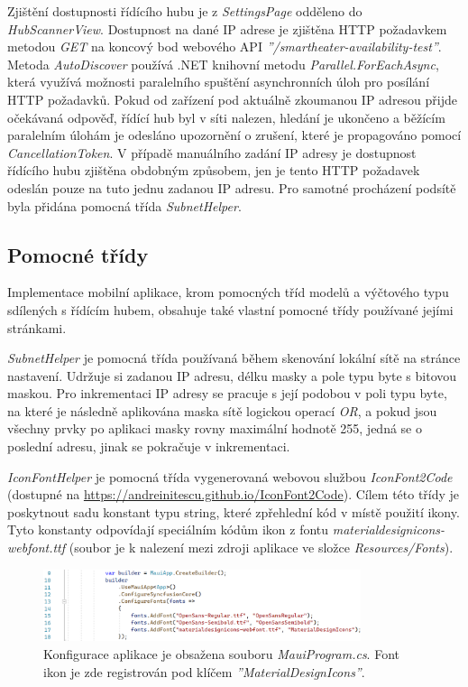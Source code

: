 Zjištění dostupnosti řídícího hubu je z {\it SettingsPage} odděleno do {\it HubScannerView}. Dostupnost na dané IP adrese je zjištěna HTTP požadavkem metodou {\it GET} na koncový bod webového API {\it ''/smartheater-availability-test''}. Metoda {\it AutoDiscover} používá .NET knihovní metodu {\it Parallel.ForEachAsync}, která využívá možnosti paralelního spuštění asynchronních úloh pro posílání HTTP požadavků. Pokud od zařízení pod aktuálně zkoumanou IP adresou přijde očekávaná odpověď, řídící hub byl v síti nalezen, hledání je ukončeno a běžícím paralelním úlohám je odesláno upozornění o zrušení, které je propagováno pomocí {\it CancellationToken}. V případě manuálního zadání IP adresy je dostupnost řídícího hubu zjištěna obdobným způsobem, jen je tento HTTP požadavek odeslán pouze na tuto jednu zadanou IP adresu. Pro samotné procházení podsítě byla přidána pomocná třída {\it SubnetHelper}.

\subsection{Pomocné třídy}
Implementace mobilní aplikace, krom pomocných tříd modelů a výčtového typu sdílených s řídícím hubem, obsahuje také vlastní pomocné třídy používané jejími stránkami.

{\it SubnetHelper} je pomocná třída používaná během skenování lokální sítě na stránce nastavení. Udržuje si zadanou IP adresu, délku masky a pole typu byte s bitovou maskou. Pro inkrementaci IP adresy se pracuje s její podobou v poli typu byte, na které je následně aplikována maska sítě logickou operací {\it OR}, a pokud jsou všechny prvky po aplikaci masky rovny maximální hodnotě 255, jedná se o poslední adresu, jinak se pokračuje v inkrementaci.

{\it IconFontHelper} je pomocná třída vygenerovaná webovou službou {\it IconFont2Code} (dostupné na \url{https://andreinitescu.github.io/IconFont2Code}). Cílem této třídy je poskytnout sadu konstant typu string, které zpřehlední kód v místě použití ikony. Tyto konstanty odpovídají speciálním kódům ikon z fontu {\it materialdesignicons-webfont.ttf} (soubor je k nalezení mezi zdroji aplikace ve složce {\it Resources/Fonts}).

\begin{figure}[hbt]
\includegraphics[width=0.83\textwidth]{obrazky-figures/code-mauiprogram.png}
\caption{Konfigurace aplikace je obsažena souboru {\it MauiProgram.cs}. Font ikon je zde registrován pod klíčem {\it ''MaterialDesignIcons''}.}
\end{figure}

